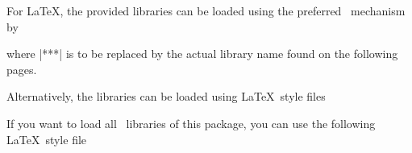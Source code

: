 \documentclass[a4paper,11pt]{article}
\begin{document}
For \LaTeX, the provided libraries can be loaded using the preferred
\tikzname\ mechanism by
\begin{dispListing*}{}
\usetikzlibrary{fill.***} %
\end{dispListing*}
where |***| is to be replaced by the actual library name found on the following pages.

Alternatively, the libraries can be loaded using \LaTeX\ style files
\begin{dispListing*}{}
\usepackage{tikzfill.***} %
\end{dispListing*}

If you want to load all \tikzname\ libraries of this package, you can use
the following \LaTeX\ style file
\begin{dispListing*}{}
\usepackage{tikzfill} %
\end{dispListing*}
\end{document}
